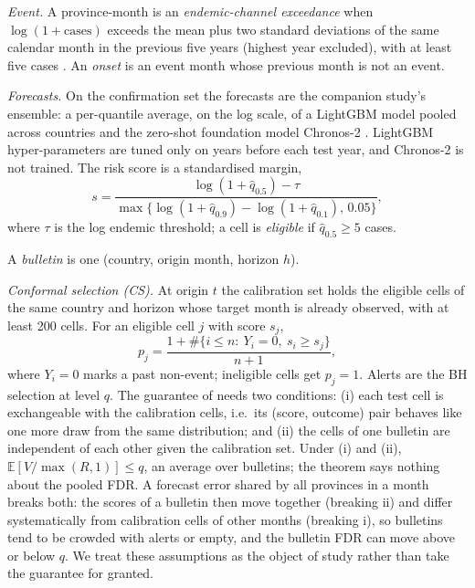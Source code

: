 \documentclass[runningheads]{llncs}
\makeatletter
\renewcommand\subsection{\@startsection{subsection}{2}{\z@}{-10\p@ \@plus -2\p@ \@minus -2\p@}{4\p@ \@plus 2\p@ \@minus 1\p@}{\normalfont\normalsize\bfseries\boldmath\rightskip=\z@ \@plus 8em\pretolerance=10000 }}
\makeatother
\begin{document}
\textit{Event.} A province-month is an \emph{endemic-channel exceedance} when $\log(1+\text{cases})$ exceeds the mean plus two standard deviations of the same calendar month in the previous five years (highest year excluded), with at least five cases \cite{bortman1999}. An \emph{onset} is an event month whose previous month is not an event.

\textit{Forecasts.} On the confirmation set the forecasts are the companion study's ensemble: a per-quantile average, on the log scale, of a LightGBM model pooled across countries \cite{ke2017lightgbm} and the zero-shot foundation model Chronos-2 \cite{ansari2025chronos2}. LightGBM hyper-parameters are tuned only on years before each test year, and Chronos-2 is not trained. The risk score is a standardised margin,
\begin{equation}
s=\frac{\log(1+\hat q_{0.5})-\tau}{\max\{\log(1+\hat q_{0.9})-\log(1+\hat q_{0.1}),\,0.05\}},
\end{equation}
where $\tau$ is the log endemic threshold; a cell is \emph{eligible} if $\hat q_{0.5}\ge 5$ cases.

\subsection{Alerting Procedures}
A \emph{bulletin} is one (country, origin month, horizon $h$).

\textit{Conformal selection (CS).} At origin $t$ the calibration set holds the eligible cells of the same country and horizon whose target month is already observed, with at least 200 cells. For an eligible cell $j$ with score $s_j$,
\begin{equation}
p_j=\frac{1+\#\{i\le n:\ Y_i=0,\ s_i\ge s_j\}}{n+1},
\end{equation}
where $Y_i=0$ marks a past non-event; ineligible cells get $p_j=1$. Alerts are the BH selection at level $q$. The guarantee of \cite{jin2023selection} needs two conditions: (i) each test cell is exchangeable with the calibration cells, i.e.\ its (score, outcome) pair behaves like one more draw from the same distribution; and (ii) the cells of one bulletin are independent of each other given the calibration set. Under (i) and (ii), $\mathbb{E}[V/\max(R,1)]\le q$, an average over bulletins; the theorem says nothing about the pooled FDR. A forecast error shared by all provinces in a month breaks both: the scores of a bulletin then move together (breaking ii) and differ systematically from calibration cells of other months (breaking i), so bulletins tend to be crowded with alerts or empty, and the bulletin FDR can move above or below $q$. We treat these assumptions as the object of study rather than take the guarantee for granted.
\end{document}
